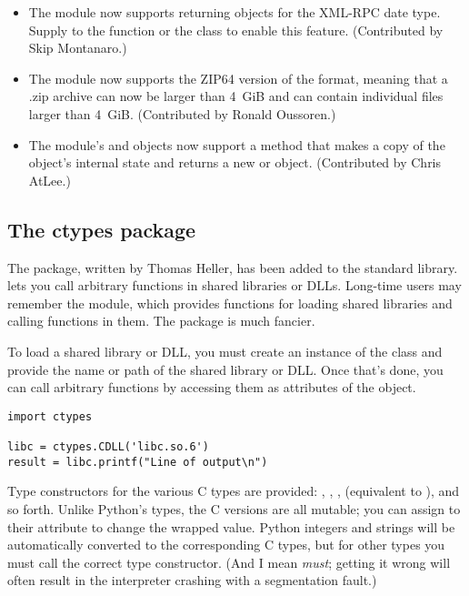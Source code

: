\documentclass{howto}
\begin{document}
\begin{itemize}
\item The  module now supports returning 
       objects for the XML-RPC date type.  Supply 
       to the  function
      or the  class to enable this feature.
      (Contributed by Skip Montanaro.)

\item The  module now supports the ZIP64 version of the 
format, meaning that a .zip archive can now be larger than 4~GiB and
can contain individual files larger than 4~GiB.  (Contributed by
Ronald Oussoren.)

\item The  module's  and 
objects now support a  method that makes a copy of the 
object's internal state and returns a new 
 or  object. 
(Contributed by Chris AtLee.)

\end{itemize}



\subsection{The ctypes package\label{module-ctypes}}

The  package, written by Thomas Heller, has been added 
to the standard library.   lets you call arbitrary functions 
in shared libraries or DLLs.  Long-time users may remember the  module, which 
provides functions for loading shared libraries and calling functions in them.  The  package is much fancier.

To load a shared library or DLL, you must create an instance of the 
 class and provide the name or path of the shared library
or DLL.  Once that's done, you can call arbitrary functions
by accessing them as attributes of the  object.  

\begin{verbatim}
import ctypes

libc = ctypes.CDLL('libc.so.6')
result = libc.printf("Line of output\n")
\end{verbatim}

Type constructors for the various C types are provided: ,
, ,  (equivalent to ), and so forth.  Unlike Python's types, the C versions are all mutable; you can assign to their  attribute
to change the wrapped value.  Python integers and strings will be automatically
converted to the corresponding C types, but for other types you 
must call the correct type constructor.  (And I mean \emph{must}; 
getting it wrong will often result in the interpreter crashing 
with a segmentation fault.)
\end{document}
